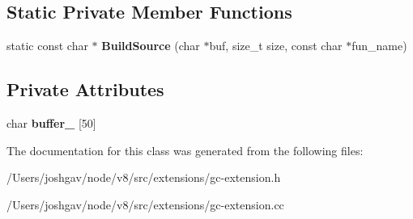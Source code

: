 \subsection*{Static Private Member Functions}
\begin{DoxyCompactItemize}
\item 
static const char $\ast$ {\bfseries Build\+Source} (char $\ast$buf, size\+\_\+t size, const char $\ast$fun\+\_\+name)\hypertarget{classv8_1_1internal_1_1_g_c_extension_a753c8965d40356fffab7ea24cd3678c3}{}\label{classv8_1_1internal_1_1_g_c_extension_a753c8965d40356fffab7ea24cd3678c3}

\end{DoxyCompactItemize}
\subsection*{Private Attributes}
\begin{DoxyCompactItemize}
\item 
char {\bfseries buffer\+\_\+} \mbox{[}50\mbox{]}\hypertarget{classv8_1_1internal_1_1_g_c_extension_a5dd911c986da8c78c859b26d20136a5a}{}\label{classv8_1_1internal_1_1_g_c_extension_a5dd911c986da8c78c859b26d20136a5a}

\end{DoxyCompactItemize}


The documentation for this class was generated from the following files\+:\begin{DoxyCompactItemize}
\item 
/\+Users/joshgav/node/v8/src/extensions/gc-\/extension.\+h\item 
/\+Users/joshgav/node/v8/src/extensions/gc-\/extension.\+cc\end{DoxyCompactItemize}

